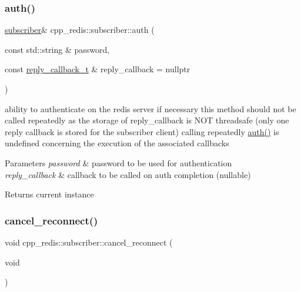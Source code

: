 \subsubsection{\texorpdfstring{auth()}{auth()}}
{\footnotesize\ttfamily \hyperlink{classcpp__redis_1_1subscriber}{subscriber}\& cpp\+\_\+redis\+::subscriber\+::auth (\begin{DoxyParamCaption}\item[{const std\+::string \&}]{password,  }\item[{const \hyperlink{classcpp__redis_1_1subscriber_a99d220cc662664e2399b709f61ac9581}{reply\+\_\+callback\+\_\+t} \&}]{reply\+\_\+callback = {\ttfamily nullptr} }\end{DoxyParamCaption})}

ability to authenticate on the redis server if necessary this method should not be called repeatedly as the storage of reply\+\_\+callback is N\+OT threadsafe (only one reply callback is stored for the subscriber client) calling repeatedly \hyperlink{classcpp__redis_1_1subscriber_a7b4564fc4dfe356b95aeae4fdb8071c9}{auth()} is undefined concerning the execution of the associated callbacks


\begin{DoxyParams}{Parameters}
{\em password} & password to be used for authentication \\
\hline
{\em reply\+\_\+callback} & callback to be called on auth completion (nullable) \\
\hline
\end{DoxyParams}
\begin{DoxyReturn}{Returns}
current instance 
\end{DoxyReturn}
\mbox{\label{classcpp__redis_1_1subscriber_a6d5bdcf7c5a67d1b56b021bbd450a7c3}} 
\subsubsection{\texorpdfstring{cancel\+\_\+reconnect()}{cancel\_reconnect()}}
{\footnotesize\ttfamily void cpp\+\_\+redis\+::subscriber\+::cancel\+\_\+reconnect (\begin{DoxyParamCaption}\item[{void}]{ }\end{DoxyParamCaption})}

